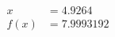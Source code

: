 \documentclass[preview]{standalone}
\begin{document}
\begin{align*}
x &= 4.9264\\f(x) &= 7.9993192
\end{align*}
\end{document}
